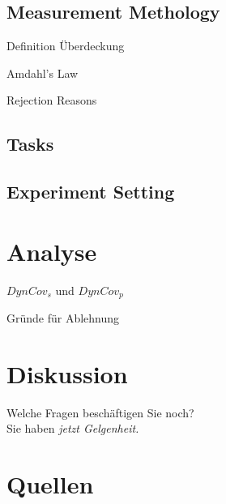 \documentclass[aspectratio=169, xcolor=dvipsnames]{beamer}
\begin{document}
\subsection{Measurement Methology}
\begin{frame}{Definition Überdeckung}
\end{frame}
\begin{frame}{Amdahl's Law}
\end{frame}
\begin{frame}{Rejection Reasons}
\end{frame}
\subsection{Tasks}
\subsection{Experiment Setting}

\section{Analyse}
\begin{frame}{\(DynCov_s\) und \(DynCov_p\)}
    \begin{figure}[!h]
        
    \end{figure}
\end{frame}
\begin{frame}{Gründe für Ablehnung}
    \begin{figure}[!h]
        
     \end{figure}
\end{frame}

\section{Diskussion}
\begin{frame}{\secname}
\end{frame}

\begin{frame}[plain]
    \begin{center}
        \Huge{Welche Fragen beschäftigen Sie noch?}\\
        \Large{Sie haben \em{jetzt} Gelgenheit.}
    \end{center}
\end{frame}

\section{Quellen}
\begin{frame}[allowframebreaks]{\secname}
    \nocite{*}
    \printbibliography
\end{frame}
\end{document}
